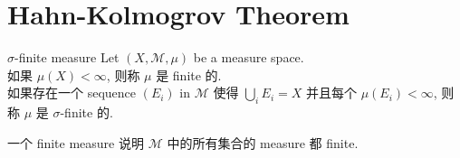 \documentclass[lang=cn,11pt]{elegantbook}
\begin{document}
\section{Hahn-Kolmogrov Theorem}
\begin{definition}{$\sigma$-finite measure}
Let $(X,\mathcal{M}, \mu)$ be a measure space.\\
如果 $\mu(X) < \infty$, 则称 $\mu$ 是 finite 的.\\
如果存在一个 sequence $(E_i)$ in $\mathcal{M}$ 使得 $\bigcup_{i} E_i = X$ 并且每个 $\mu(E_i) < \infty$, 则称 $\mu$ 是 $\sigma$-finite 的.
\end{definition}
\begin{remark}
一个 finite measure 说明 $\mathcal{M}$ 中的所有集合的 measure 都 finite.
\end{remark}
\end{document}
